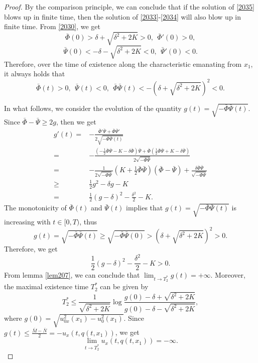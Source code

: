 \documentclass[preprint,12pt]{elsarticle}
\numberwithin{equation}{section}
\begin{document}
\begin{proof}
By the comparison principle, we can conclude that if the solution of \eqref{2035} blows up in finite time, then the solution of \eqref{2033}-\eqref{2034} will also blow up in finite time.
From \eqref{2030}, we get
$$\bar{\Phi}(0)>\delta+\sqrt{\delta^{2}+2K}>0,\ \ \bar{\Phi}'(0)>0,
$$
$$\bar{\Psi}(0)<-\delta-\sqrt{\delta^{2}+2K}<0,\ \ \bar{\Psi}'(0)<0.
$$
Therefore, over the time of existence along the characteristic emanating from $x_{1}$, it always holds that
$$\bar{\Phi}(t)>0,\ \ \bar{\Psi}(t)<0,\ \ \bar{\Phi}\bar{\Psi}(t)<-(\delta+\sqrt{\delta^{2}+2K})^{2}<0.$$

In what follows, we consider the evolution of the quantity $g(t)=\sqrt{-\bar{\Phi}\bar{\Psi}(t)}$. Since $\bar{\Phi}-\bar{\Psi}\geq 2g$, then we get
\begin{align}
g'(t)=&-\frac{\bar{\Phi}'\bar{\Psi}+\bar{\Phi}\bar{\Psi}'}{2\sqrt{-\bar{\Phi}\bar{\Psi}(t)}}\nonumber\\
=&-\frac{\left(-\frac{1}{2}\bar{\Phi}\bar{\Psi}-K-\delta \bar{\Phi}\right)\bar{\Psi}
+\bar{\Phi}\left(\frac{1}{2}\bar{\Phi}\bar{\Psi}+K-\delta \bar{\Psi}\right)}{2\sqrt{-\bar{\Phi}\bar{\Psi}}}\nonumber\\
=&-\frac{1}{2\sqrt{-\bar{\Phi}\bar{\Psi}}}\left(K+\frac{1}{2}\bar{\Phi}\bar{\Psi}\right)(\bar{\Phi}-\bar{\Psi})+\frac{\delta \bar{\Phi}\bar{\Psi}}{\sqrt{-\bar{\Phi}\bar{\Psi}}}
\nonumber\\
\geq&\frac{1}{2}g^{2}-\delta g-K\nonumber\\
=&\frac{1}{2}(g-\delta)^{2}-\frac{\delta^{2}}{2}-K.
\label{2036}
\end{align}
The monotonicity of $\bar{\Phi}(t)$ and $\bar{\Psi}(t)$ implies that $g(t)=\sqrt{-\bar{\Phi}\bar{\Psi}(t)}$ is increasing with $t\in[0,T)$, thus
\begin{equation}
g(t)=\sqrt{-\bar{\Phi}\bar{\Psi}(t)}\geq\sqrt{-\bar{\Phi}\bar{\Psi}(0)}>(\delta+\sqrt{\delta^{2}+2K})^{2}>0.
\label{2037}
\end{equation}
Therefore, we get
$$\frac{1}{2}(g-\delta)^{2}-\frac{\delta^{2}}{2}-K>0.$$
From lemma \ref{lem207}, we can conclude that $\lim_{t\rightarrow T_{2}^{\ast}}g(t)=+\infty$. Moreover, the maximal existence time $T_{2}^{\ast}$ can be given by
$$T_{2}^{\ast}\leq\frac{1}{\sqrt{\delta^{2}+2K}}\log\frac{g(0)-\delta+\sqrt{\delta^{2}+2K}}{g(0)-\delta-\sqrt{\delta^{2}+2K}},$$
where $g(0)=\sqrt{u_{0x}^{2}(x_{1})-u_{0}^{2}(x_{1})}$.
Since $g(t)\leq \frac{\bar{M}-\bar{N}}{2}=-u_{x}(t,q(t,x_{1}))$, we get
$$\lim_{t\rightarrow T_{2}^{\ast}}u_{x}(t,q(t,x_{1}))=-\infty.$$


\end{proof}
\end{document}
